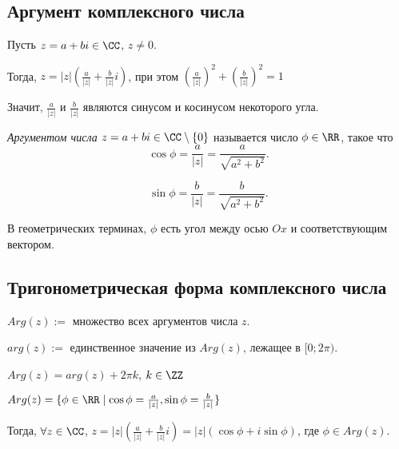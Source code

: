 \subsection{Аргумент комплексного числа}

Пусть $z = a + bi \in \CC$, $z \neq 0$.

Тогда, $z = |z| \left(\frac{a}{|z|} + \frac{b}{|z|}i\right)$, при этом $\left(\frac{a}{|z|}\right)^2 + \left(\frac{b}{|z|}\right)^2 = 1$

Значит, $\frac{a}{|z|}$ и $\frac{b}{|z|}$ являются синусом и косинусом некоторого угла.

\begin{definition}
    \textit{Аргументом числа} $z = a + bi \in \CC \setminus \{0\}$ называется число $\phi \in \RR$, такое что
    \begin{equation*}
        \cos \phi = \frac{a}{|z|} = \frac{a} {\sqrt{a^2 + b^2}}
    .\end{equation*}

    \begin{equation*}
        \sin \phi = \frac{b}{|z|} = \frac{b}{\sqrt{a^2 + b^2}}
    .\end{equation*}

    В геометрических терминах, $\phi$ есть угол между осью $Ox$ и соответствующим вектором.
\end{definition}

\begin{comment}
    При $z \neq 0$, аргумент определен с точностью до $2 \pi k$, $k \in \ZZ$.
\end{comment}

\begin{comment}
    При $z = 0$, удобно считать что любое $\phi$ является аргументом.
\end{comment}


\subsection{Тригонометрическая форма комплексного числа}

$Arg(z) :=$ множество всех аргументов числа $z$.

$arg(z) :=$ единственное значение из $Arg(z)$, лежащее в $[0; 2 \pi)$.

$Arg(z) = arg(z) + 2 \pi k$, $k \in \ZZ$

$Arg(z) = \{\phi \in \RR \mid \cos \phi = \frac{a}{|z|}, \sin \phi = \frac{b}{|z|}\}$

Тогда, $\forall z \in \CC$, $z = |z| \left(\frac{a}{|z|} + \frac{b}{|z|} i\right) = |z| \left(\cos \phi + i \sin \phi\right)$, где $\phi \in Arg(z)$.

